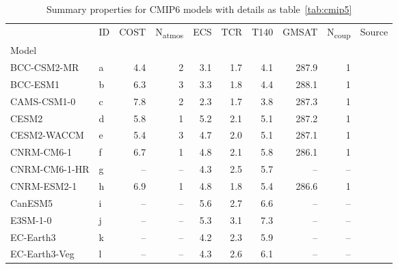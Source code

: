 \begin{table}
\centering
\caption{Summary properties for CMIP6 models with details as table~\ref{tab:cmip5}}
\label{tab:cmip6}
\begin{tabular}{llrrrrrrrl}
\toprule
{} &  ID &  COST &  N\textsubscript{atmos} &  ECS &  TCR &  T140 &  GMSAT &  N\textsubscript{coup} &                Source \\
Model           &     &       &                         &      &      &       &        &                        &                       \\
\midrule
BCC-CSM2-MR     &   a &   4.4 &                       2 &  3.1 &  1.7 &   4.1 &  287.9 &                      1 &  \citet{ringer20cmip} \\
BCC-ESM1        &   b &   6.3 &                       3 &  3.3 &  1.8 &   4.4 &  288.1 &                      1 &  \citet{ringer20cmip} \\
CAMS-CSM1-0     &   c &   7.8 &                       2 &  2.3 &  1.7 &   3.8 &  287.3 &                      1 &  \citet{ringer20cmip} \\
CESM2           &   d &   5.8 &                       1 &  5.2 &  2.1 &   5.1 &  287.2 &                      1 &  \citet{ringer20cmip} \\
CESM2-WACCM     &   e &   5.4 &                       3 &  4.7 &  2.0 &   5.1 &  287.1 &                      1 &  \citet{ringer20cmip} \\
CNRM-CM6-1      &   f &   6.7 &                       1 &  4.8 &  2.1 &   5.8 &  286.1 &                      1 &  \citet{ringer20cmip} \\
CNRM-CM6-1-HR   &   g &    -- &                    -- &  4.3 &  2.5 &   5.7 &     -- &                   -- &  \citet{ringer20cmip} \\
CNRM-ESM2-1     &   h &   6.9 &                       1 &  4.8 &  1.8 &   5.4 &  286.6 &                      1 &  \citet{ringer20cmip} \\
CanESM5         &   i &    -- &                    -- &  5.6 &  2.7 &   6.6 &     -- &                   -- &  \citet{ringer20cmip} \\
E3SM-1-0        &   j &    -- &                    -- &  5.3 &  3.1 &   7.3 &     -- &                   -- &  \citet{ringer20cmip} \\
EC-Earth3       &   k &    -- &                    -- &  4.2 &  2.3 &   5.9 &     -- &                   -- &  \citet{ringer20cmip} \\
EC-Earth3-Veg   &   l &    -- &                    -- &  4.3 &  2.6 &   6.1 &     -- &                   -- &  \citet{ringer20cmip} \\

\end{tabular}
\end{table}
